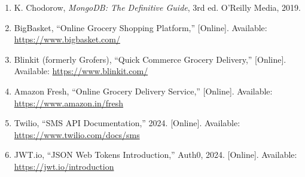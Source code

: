 \documentclass[12pt,a4paper]{report}
\begin{document}
\begin{enumerate}
\item K. Chodorow, \textit{MongoDB: The Definitive Guide}, 3rd ed. O'Reilly Media, 2019.

\item BigBasket, ``Online Grocery Shopping Platform,'' [Online]. Available: \url{https://www.bigbasket.com/}

\item Blinkit (formerly Grofers), ``Quick Commerce Grocery Delivery,'' [Online]. Available: \url{https://www.blinkit.com/}

\item Amazon Fresh, ``Online Grocery Delivery Service,'' [Online]. Available: \url{https://www.amazon.in/fresh}

\item Twilio, ``SMS API Documentation,'' 2024. [Online]. Available: \url{https://www.twilio.com/docs/sms}

\item JWT.io, ``JSON Web Tokens Introduction,'' Auth0, 2024. [Online]. Available: \url{https://jwt.io/introduction}

\end{enumerate}
\end{document}
